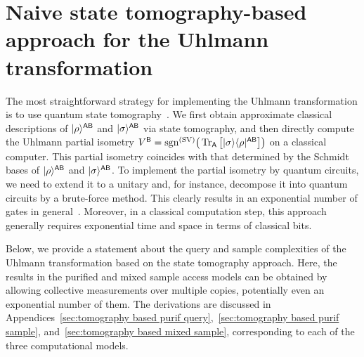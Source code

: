 


\section{Naive state tomography-based approach for the Uhlmann transformation}
\label{sec:Comparing with a naive tomography-based}



The most straightforward strategy for implementing the Uhlmann transformation is to use quantum state tomography~\cite{ODonnell2016EffTomo, Haah2017samploptTomo, Guta2020FastTomo, Apeldoorn2023TomoPurifQuery, Chen2023WhenAdapTomo, hu2024sampleoptimalmemoryefficient}.
We first obtain approximate classical descriptions of $|\rho\rangle^{{\mathsf{A}}{\mathsf{B}}}$ and $|\sigma\rangle^{{\mathsf{A}}{\mathsf{B}}}$ via state tomography, and then directly compute the Uhlmann partial isometry $V^{\mathsf{B}} = \mathrm{sgn}^{(\rm SV)}\big(\operatorname{Tr}_{{\mathsf{A}}}\big[|\sigma\rangle\langle\rho|^{{\mathsf{A}}{\mathsf{B}}}\big]\big)$ on a classical computer.
This partial isometry coincides with that determined by the Schmidt bases of $|\rho\rangle^{{\mathsf{A}}{\mathsf{B}}}$ and $|\sigma\rangle^{{\mathsf{A}}{\mathsf{B}}}$.
To implement the partial isometry by quantum circuits, we need to extend it to a unitary and, for instance, decompose it into quantum circuits by a brute-force method. This clearly results in an exponential number of gates in general~\cite{nielsen2010quantum}.
Moreover, in a classical computation step, this approach generally requires exponential time and space in terms of classical bits.



Below, we provide a statement about the query and sample complexities of the Uhlmann transformation based on the state tomography approach.
Here, the results in the purified and mixed sample access models can be obtained by allowing collective measurements over multiple copies, potentially even an exponential number of them.
The derivations are discussed in Appendices~\ref{sec:tomography based purif query},~\ref{sec:tomography based purif sample}, and~\ref{sec:tomography based mixed sample}, corresponding to each of the three computational models.


